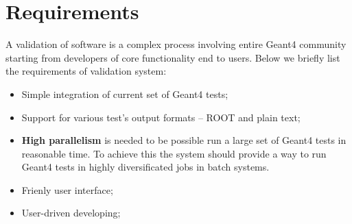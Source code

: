 \section{Requirements}
\label{sec:requirements}

A validation of software is a complex process involving entire Geant4 community starting from developers of core functionality end to users. Below we briefly list the requirements of validation system:

\begin{itemize}
    \item Simple integration of current set of Geant4 tests;
    \item Support for various test's output formats -- ROOT and plain text;
    \item \textbf{High parallelism} is needed to be possible run a large set of Geant4 tests in reasonable time. To achieve this the system should provide a way to run Geant4 tests in highly diversificated jobs in batch systems.
    
    \item Frienly user interface;
    \item User-driven developing;
\end{itemize}